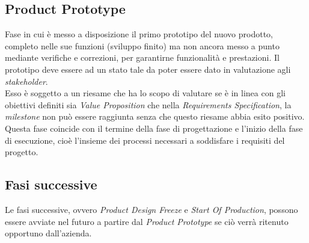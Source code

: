 \subsection{Product Prototype}
Fase in cui è messo a disposizione il primo prototipo del nuovo prodotto, completo nelle sue funzioni (sviluppo finito) ma non ancora messo a punto mediante verifiche e correzioni, per garantirne funzionalità e prestazioni. Il prototipo deve essere ad un stato tale da poter essere dato in valutazione agli \emph{stakeholder}.\\
Esso è soggetto a un riesame che ha lo scopo di valutare se è in linea con gli obiettivi definiti sia \emph{Value Proposition} che nella \emph{Requirements Specification}, la \emph{milestone} non può essere raggiunta senza che questo riesame abbia esito positivo.\\
Questa fase coincide con il termine della fase di progettazione e l'inizio della fase di esecuzione, cioè l'insieme dei processi necessari a soddisfare i requisiti del progetto.

\subsection{Fasi successive}
Le fasi successive, ovvero \emph{Product Design Freeze} e \emph{Start Of Production}, possono essere avviate nel futuro a partire dal \emph{Product Prototype} se ciò verrà ritenuto opportuno dall'azienda.